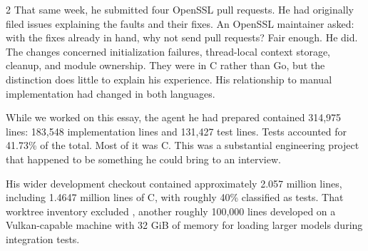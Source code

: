 \begin{multicols}{2}
That same week, he submitted four OpenSSL pull requests. He had originally filed issues explaining the faults and their fixes. An OpenSSL maintainer asked: with the fixes already in hand, why not send pull requests? Fair enough. He did. The changes concerned initialization failures, thread-local context storage, cleanup, and module ownership. They were in C rather than Go, but the distinction does little to explain his experience. His relationship to manual implementation had changed in both languages.


While we worked on this essay, the agent he had prepared contained 314,975 lines: 183,548 implementation lines and 131,427 test lines. Tests accounted for 41.73\% of the total. Most of it was C. This was a substantial engineering project that happened to be something he could bring to an interview.

His wider development checkout contained approximately 2.057 million lines, including 1.4647 million lines of C, with roughly 40\% classified as tests. That worktree inventory excluded , another roughly 100,000 lines developed on a Vulkan-capable machine with 32 GiB of memory for loading larger models during integration tests.
\end{multicols}
\clearpage

